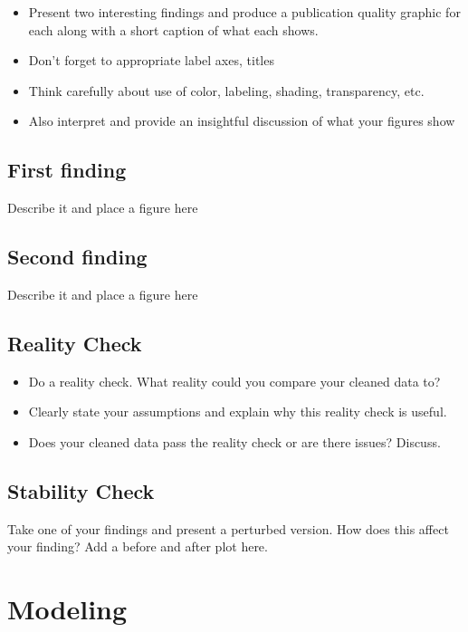 \documentclass[10pt,letterpaper]{article}
\begin{document}
\begin{itemize}
\item Present two interesting findings and produce a publication quality graphic for each along with a short caption of what each shows.
\item Don't forget to appropriate label axes, titles
\item Think carefully about use of color, labeling, shading, transparency, etc.
\item Also interpret and provide an insightful discussion of what your figures show
\end{itemize}

\subsection{First finding}\label{first-finding}

Describe it and place a figure here

\subsection{Second finding}\label{second-finding}

Describe it and place a figure here

\subsection{Reality Check}\label{reality-check}

\begin{itemize}
\item Do a reality check. What reality could you compare your cleaned data to?
\item Clearly state your assumptions and explain why this reality check is useful.
\item Does your cleaned data pass the reality check or are there issues? Discuss.
\end{itemize}

\subsection{Stability Check}\label{stability-check}

Take one of your findings and present a perturbed version. How does this
affect your finding? Add a before and after plot here.

\section{Modeling}
\end{document}
